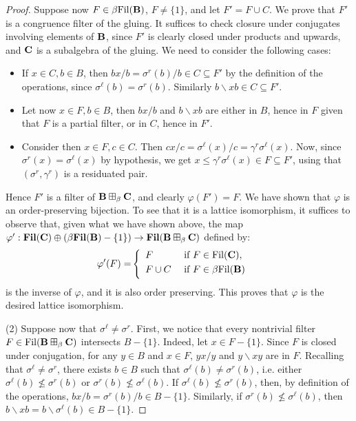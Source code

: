 \documentclass{amsart}
\theoremstyle{definition}
\numberwithin{equation}{section}
\newcommand{\alg}[1]{{\textbf{\upshape #1}}}  %
\newcommand{\sse}{\subseteq}
\newcommand{\back}{\backslash}
\newcommand{\sell}{\sigma^\ell}
\newcommand{\sr}{\sigma^r}
\newcommand{\gr}{\gamma^r}
\newcommand{\fil}{\mathbf{Fil}}
\newcommand{\dfil}{{\rm Fil}}
\newcommand{\betafil}{\mathbf{\beta Fil}}
\newcommand{\dbetafil}{{\rm \beta Fil}}
\begin{document}
\begin{proof}
	  Suppose now $F \in \dbetafil(\alg B)$, $F \neq\{1\}$, and let $F' = F \cup C$. We prove that $F'$ is a congruence filter of the gluing. It suffices to check closure under conjugates involving elements of $\alg B$, since $F'$ is clearly closed under products and upwards, and $\alg C$ is a subalgebra of the gluing. We need to consider the following cases:
	  \begin{itemize}
	  	\item If $x \in C, b \in B$, then $bx/b = \sr(b) / b \in C\sse F'$ by the definition of the operations, since $\sell(b) = \sr(b)$. Similarly $b \back xb \in C \sse F'$.
	  	\item  Let now $x \in F, b \in B$, then $bx/b$ and $b \backslash xb$ are either in $B$, hence in $F$ given that $F$ is a partial filter, or in $C$, hence in $F'$.
	  	\item Consider then $x \in F, c \in C$. Then $cx / c = \sell(x) / c = \gr\sell(x)$. Now, since $\sr(x) = \sell(x)$ by hypothesis, we get $x \leq  \gr\sell(x) \in F\sse F'$, using that $(\sr, \gr)$ is a residuated pair. 
	  \end{itemize}
	   Hence $F'$ is a filter of $\alg B \boxplus_\beta \alg C$, and clearly $\varphi(F') = F$. We have shown that $\varphi$ is an order-preserving bijection. To see that it is a lattice isomorphism, it suffices to observe that, given what we have shown above, the map $\varphi': \fil(\alg C) \oplus (\betafil(\alg B)-\{1\}) \to  \fil(\alg B \boxplus_\beta \alg C)$ defined by:
	    \begin{align*}
	\varphi'(F) = &\left\{\begin{array}{l l}
F &\mbox{ if } F \in \dfil(\alg C), \vspace{0.1cm}\\
F \cup C &\mbox{ if } F \in \dbetafil(\alg B) \vspace{0.1cm}
\end{array}\right.
\end{align*}
	   is the inverse of $\varphi$, and it is also order preserving.
	   This proves that $\varphi$ is the desired lattice isomorphism.
	 
	 (2) Suppose now that $\sell \neq \sr$. First, we notice that every nontrivial filter $F \in  \dfil(\alg B \boxplus_\beta \alg C)$ intersects $B - \{1\}$. Indeed, let $ x\in F-\{1\}$. Since  $F$ is closed under conjugation, for any $y \in B$ and $x \in F $, $y x / y$ and $y \backslash x y $ are in $F$. Recalling that $\sell \neq \sr$, there exists $b \in B$ such that $\sell(b)\neq \sr(b)$, i.e. either $\sell(b)\not \leq \sr(b)$ or $\sr(b)\not \leq \sell(b)$. If $\sell(b)\not \leq \sr(b)$, then, by definition of the operations, $b x / b=\sr(b)/b \in B -\{1\}$. Similarly, if $\sr(b)\not \leq \sell(b)$, then $b \backslash x b=b \backslash \sell(b) \in B-\{1\}$. 


\end{proof}
\end{document}

